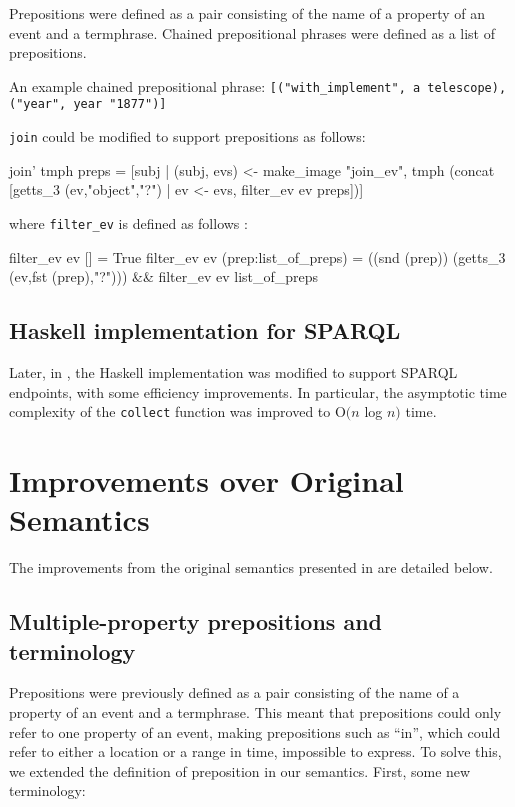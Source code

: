 \documentclass[../main.tex]{subfiles}
\begin{document}
Prepositions were defined as a pair consisting of the name of a property
of an event and a termphrase.  Chained prepositional phrases were defined
as a list of prepositions.

An example chained prepositional phrase: \texttt{[("with\_implement", a
telescope), ("year", year "1877")]}

\texttt{join} could be modified to support prepositions as
follows:

\begin{code}
  join’ tmph preps = [subj | (subj, evs) <- make_image "join_ev", 
    tmph (concat [getts_3 (ev,"object","?") | ev <- evs,
      filter_ev ev preps])]
\end{code}

where \texttt{filter\_ev} is defined as follows \cite{frost2014denotational}:

\begin{code}
  filter_ev ev [] = True
  filter_ev ev (prep:list_of_preps) = ((snd (prep)) (getts_3 (ev,fst (prep),"?")))
                                      && filter_ev ev list_of_preps
\end{code}

\subsection{Haskell implementation for SPARQL}

Later, in \cite{agboola2015extensible}, the Haskell implementation was modified
to support SPARQL endpoints, with some efficiency improvements.  In particular, the asymptotic time complexity of the \texttt{collect} function was improved to O$(n$ log $n)$ time.

\section{Improvements over Original Semantics}

The improvements from the original semantics presented in \cite{frost2014demonstration} \cite{frostagboola2014} are detailed below.

\subsection{Multiple-property prepositions and terminology}

Prepositions were previously defined as a pair consisting of the name of a property of an event and a termphrase.  This meant that prepositions could
only refer to one property of an event, making prepositions such as ``in'', which could refer to either a location or a range in time, impossible to express.
To solve this, we extended the definition of preposition in our semantics.  First, some new terminology:
\end{document}
